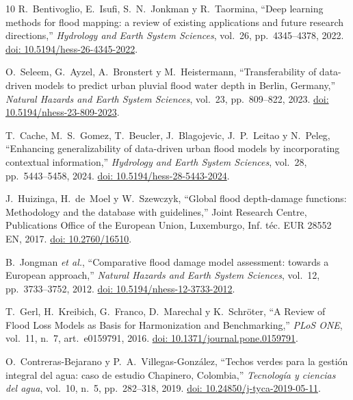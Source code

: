 \documentclass[journal]{IEEEtran}
\begin{document}
\begin{thebibliography}{10}
R.~Bentivoglio, E.~Isufi, S.~N.~Jonkman y R.~Taormina, ``Deep learning methods for flood mapping: a review of existing applications and future research directions,'' \emph{Hydrology and Earth System Sciences}, vol.~26, pp.~4345--4378, 2022. \href{https://doi.org/10.5194/hess-26-4345-2022}{doi: 10.5194/hess-26-4345-2022}.

O.~Seleem, G.~Ayzel, A.~Bronstert y M.~Heistermann, ``Transferability of data-driven models to predict urban pluvial flood water depth in Berlin, Germany,'' \emph{Natural Hazards and Earth System Sciences}, vol.~23, pp.~809--822, 2023. \href{https://doi.org/10.5194/nhess-23-809-2023}{doi: 10.5194/nhess-23-809-2023}.

T.~Cache, M.~S.~Gomez, T.~Beucler, J.~Blagojevic, J.~P.~Leitao y N.~Peleg, ``Enhancing generalizability of data-driven urban flood models by incorporating contextual information,'' \emph{Hydrology and Earth System Sciences}, vol.~28, pp.~5443--5458, 2024. \href{https://doi.org/10.5194/hess-28-5443-2024}{doi: 10.5194/hess-28-5443-2024}.

J.~Huizinga, H.~de~Moel y W.~Szewczyk, ``Global flood depth-damage functions: Methodology and the database with guidelines,'' Joint Research Centre, Publications Office of the European Union, Luxemburgo, Inf. téc. EUR 28552 EN, 2017. \href{https://doi.org/10.2760/16510}{doi: 10.2760/16510}.

B.~Jongman \emph{et al.}, ``Comparative flood damage model assessment: towards a European approach,'' \emph{Natural Hazards and Earth System Sciences}, vol.~12, pp.~3733--3752, 2012. \href{https://doi.org/10.5194/nhess-12-3733-2012}{doi: 10.5194/nhess-12-3733-2012}.

\newpage
{}
T.~Gerl, H.~Kreibich, G.~Franco, D.~Marechal y K.~Schröter, ``A Review of Flood Loss Models as Basis for Harmonization and Benchmarking,'' \emph{PLoS ONE}, vol.~11, n.\textordmasculine~7, art.~e0159791, 2016. \href{https://doi.org/10.1371/journal.pone.0159791}{doi: 10.1371/journal.pone.0159791}.

O.~Contreras-Bejarano y P.~A.~Villegas-González, ``Techos verdes para la gestión integral del agua: caso de estudio Chapinero, Colombia,'' \emph{Tecnología y ciencias del agua}, vol.~10, n.\textordmasculine~5, pp.~282--318, 2019. \href{https://doi.org/10.24850/j-tyca-2019-05-11}{doi: 10.24850/j-tyca-2019-05-11}.


\end{thebibliography}
\end{document}
